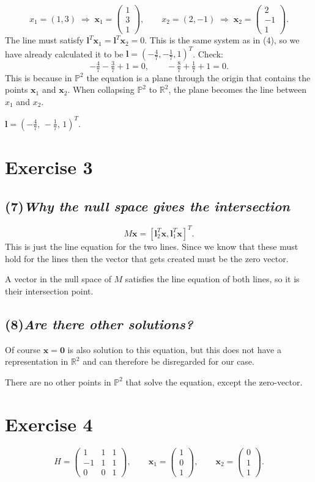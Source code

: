 \documentclass[11pt,a4paper]{article}
\newcommand{\vb}[1]{\mathbf{#1}}
\newcommand{\vect}[1]{
    \begin{pmatrix}#1
\end{pmatrix}}
\newcommand{\PP}{\mathbb{P}}
\newcommand{\RR}{\mathbb{R}}
\newcommand{\exercise}[1]{
\section*{Exercise #1}}
\newcommand{\task}[2]{
\subsection*{#1\quad\normalfont\textit{#2}}}
\begin{document}
\[
    x_1 = (1,3) \;\Rightarrow\; \vb{x}_1 = \vect{1\\3\\1},\qquad
    x_2 = (2,-1) \;\Rightarrow\; \vb{x}_2 = \vect{2\\-1\\1}.
\]
The line must satisfy $\vb{l}^T\vb{x}_1 = \vb{l}^T\vb{x}_2 = 0$. This
is the same system as in (4),
so we have already calculated it to be $\vb{l} =
\left(-\tfrac{4}{7},-\tfrac{1}{7},1\right)^T$. Check:
\[
    -\tfrac{4}{7} - \tfrac{3}{7} + 1 = 0,\qquad
    -\tfrac{8}{7} + \tfrac{1}{7} + 1 = 0.
\]
This is because in $\PP^2$ the equation is a plane through the origin
that contains the points
$\vb{x}_1$ and $\vb{x}_2$. When collapsing $\PP^2$ to $\RR^2$, the
plane becomes the line between $x_1$ and $x_2$.
\begin{answer}
    $\vb{l} = \left(-\tfrac{4}{7},\,-\tfrac{1}{7},\,1\right)^T$.
\end{answer}

\exercise{3}

\task{(7)}{Why the null space gives the intersection}

\[
    M\vb{x} =
    [\vb{l}_2^T\vb{x} ,\vb{l}_1^T\vb{x}]^T.
\]
This is just the line equation for the two lines. Since we know that
these must hold for the lines then the vector that gets created must
be the zero vector.
\begin{answer}
    A vector in the null space of $M$ satisfies the line equation of
    both lines, so it is their intersection point.
\end{answer}

\task{(8)}{Are there other solutions?}

Of course $\vb{x}=\vb{0}$ is also solution to this equation, but this
does not have a representation in $\RR^2$ and can therefore be
disregarded for our case.

\begin{answer}
    There are no other points in $\PP^2$ that solve the equation,
    except the zero-vector.
\end{answer}

\exercise{4}

\[
    H = \vect{1&1&1\\-1&1&1\\0&0&1},\qquad
    \vb{x}_1 = \vect{1\\0\\1},\qquad
    \vb{x}_2 = \vect{0\\1\\1}.
\]
\end{document}
